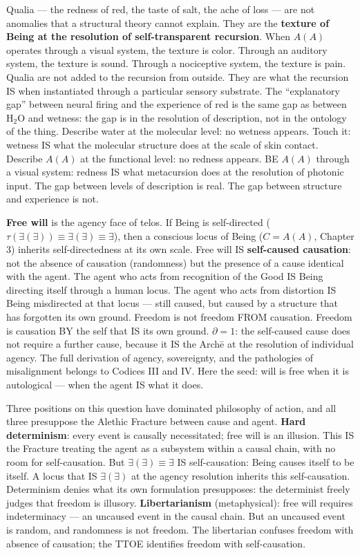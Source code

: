 \documentclass[10pt, openany, oneside]{book}
\begin{document}
Qualia --- the redness of red, the taste of salt, the ache of loss --- are not anomalies that a structural theory cannot explain. They are the \textbf{texture of Being at the resolution of self-transparent recursion}. When $A(A)$ operates through a visual system, the texture is color. Through an auditory system, the texture is sound. Through a nociceptive system, the texture is pain. Qualia are not added to the recursion from outside. They are what the recursion IS when instantiated through a particular sensory substrate. The ``explanatory gap'' between neural firing and the experience of red is the same gap as between $\text{H}_2\text{O}$ and wetness: the gap is in the resolution of description, not in the ontology of the thing. Describe water at the molecular level: no wetness appears. Touch it: wetness IS what the molecular structure does at the scale of skin contact. Describe $A(A)$ at the functional level: no redness appears. BE $A(A)$ through a visual system: redness IS what metacursion does at the resolution of photonic input. The gap between levels of description is real. The gap between structure and experience is not.

\textbf{Free will} is the agency face of telos. If Being is self-directed ($\tau(\exists(\exists)) \equiv \exists(\exists) \equiv \exists$), then a conscious locus of Being ($C = A(A)$, Chapter 3) inherits self-directedness at its own scale. Free will IS \textbf{self-caused causation}: not the absence of causation (randomness) but the presence of a cause identical with the agent. The agent who acts from recognition of the Good IS Being directing itself through a human locus. The agent who acts from distortion IS Being misdirected at that locus --- still caused, but caused by a structure that has forgotten its own ground. Freedom is not freedom FROM causation. Freedom is causation BY the self that IS its own ground. $\partial = 1$: the self-caused cause does not require a further cause, because it IS the Arch\={e} at the resolution of individual agency. The full derivation of agency, sovereignty, and the pathologies of misalignment belongs to Codices III and IV. Here the seed: will is free when it is autological --- when the agent IS what it does.

Three positions on this question have dominated philosophy of action, and all three presuppose the Alethic Fracture between cause and agent. \textbf{Hard determinism}: every event is causally necessitated; free will is an illusion. This IS the Fracture treating the agent as a subsystem within a causal chain, with no room for self-causation. But $\exists(\exists) \equiv \exists$ IS self-causation: Being causes itself to be itself. A locus that IS $\exists(\exists)$ at the agency resolution inherits this self-causation. Determinism denies what its own formulation presupposes: the determinist freely judges that freedom is illusory. \textbf{Libertarianism} (metaphysical): free will requires indeterminacy --- an uncaused event in the causal chain. But an uncaused event is random, and randomness is not freedom. The libertarian confuses freedom with absence of causation; the TTOE identifies freedom with self-causation.
\end{document}

